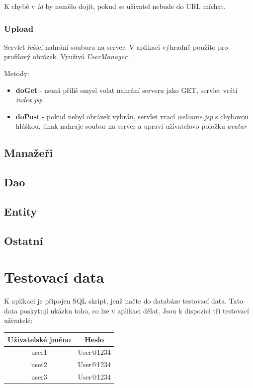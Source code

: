 \documentclass[
12pt,
a4paper,
pdftex,
czech,
titlepage
]{report}
\begin{document}
K chybě v \textit{id} by nemělo dojít, pokud se uživatel nebude do URL míchat.

\subsection{Upload}

Servlet řešící nahrání souboru na server. V aplikaci výhradně použito pro profilový obrázek. Využivá \textit{UserManager}.

Metody:
\begin{itemize}
\item \textbf{doGet} - nemá příliš smysl volat nahrání serveru jako GET, servlet vrátí \textit{index.jsp}
\item \textbf{doPost} - pokud nebyl obrázek vybrán, servlet vrací \textit{welcome.jsp} s chybovou hláškou, jinak nahraje soubor na server a upraví uživatelovo položku \textit{avatar}
\end{itemize}

\section{Manažeři}



\section{Dao}

\section{Entity}

\section{Ostatní}

\chapter{Testovací data}

K aplikaci je připojen SQL skript, jenž načte do databáze testovací data. Tato data poskytují ukázku toho, co lze v aplikaci dělat. Jsou k dispozici tři testovací uživatelé:

\begin{center}
\begin{tabular}{| c | c | }
\hline
	\textbf{Uživatelské jméno} & \textbf{Heslo} \\
	\hline
  user1 & User@1234  \\
  \hline
  user2 & User@1234  \\
  \hline
  user3 & User@1234  \\
  \hline
\end{tabular}
\end{center}
\end{document}
